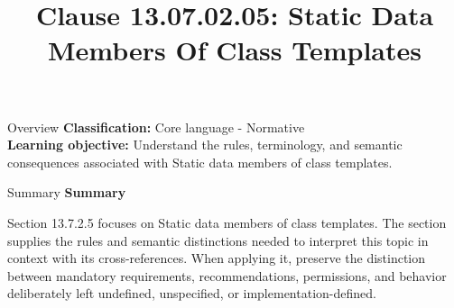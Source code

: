 \documentclass[10pt,letterpaper]{article}
\title{Clause 13.07.02.05: Static Data Members Of Class Templates}
\author{}
\date{}
\begin{document}
\maketitle
\begin{CornellOverviewBox}{Overview}
\textbf{Classification:} Core language - Normative\\[2pt]
\textbf{Learning objective:} Understand the rules, terminology, and semantic consequences associated with Static data members of class templates.
\end{CornellOverviewBox}\begin{CornellSummaryBox}{Summary}
{\sffamily\bfseries\color{Accent} Summary}\par\vspace{3pt}Section 13.7.2.5 focuses on Static data members of class templates. The section supplies the rules and semantic distinctions needed to interpret this topic in context with its cross-references. When applying it, preserve the distinction between mandatory requirements, recommendations, permissions, and behavior deliberately left undefined, unspecified, or implementation-defined.
\end{CornellSummaryBox}
\end{document}
